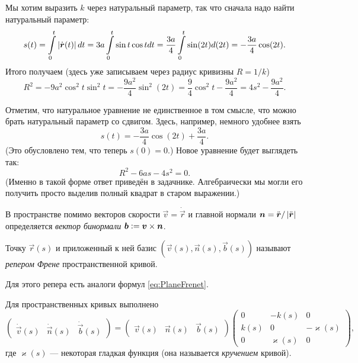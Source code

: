 \begin{solution}
	Мы хотим выразить $k$ через натуральный параметр, так что сначала надо найти натуральный параметр:
	\[
		s(t) = \int\limits_0^t\abs{\dot{\vec{r}}(t)}dt = 3a\int\limits_0^t\sin t\cos tdt = \frac{3a}{4}\int\limits_0^t\sin(2t) d(2t) = -\frac{3a}{4}\cos(2t).
	\]
	Итого получаем (здесь уже записываем через радиус кривизны $R = 1 / k$)
	\[
		R^2 = -9a^2\cos^2t\sin^2t = -\frac{9a^2}{4}\sin^2(2t) = \frac{9}{4}\cos^2t - \frac{9a^2}{4} = 4s^2 - \frac{9a^2}{4}.
	\]

	Отметим, что натуральное уравнение не единственное в том смысле, что можно брать натуральный параметр со сдвигом. Здесь, например, немного удобнее взять
	\[
		s(t) = -\frac{3a}{4}\cos(2t) + \frac{3a}{4}.
	\]
	(Это обусловлено тем, что теперь $s(0) = 0$.) Новое уравнение будет выглядеть так:
	\[
		R^2 - 6as - 4s^2 = 0.
	\]
	(Именно в такой форме ответ приведён в задачнике. Алгебраически мы могли его получить просто выделив полный квадрат в старом выражении.)
\end{solution}

В пространстве помимо векторов скорости $\vec{v} = \dot{\vec{r}}$ и главной нормали $\vec{n} = \ddot{\vec{r}} / \abs{\ddot{\vec{r}}}$ определяется \textit{вектор бинормали} $\vec{b} \vcentcolon = \vec{v} \times \vec{n}$.

\begin{definition}
	Точку $\vec{r}(s)$ и приложенный к ней базис $(\vec{v}(s), \vec{n}(s), \vec{b}(s))$ называют \textit{репером Френе} пространственной кривой.
\end{definition}

Для этого репера есть аналоги формул \eqref{eq:PlaneFrenet}.

\begin{theorem}
	Для пространственных кривых выполнено
	\begin{equation} \label{eq:SpaceFrenet}
		\begin{pmatrix}
			\dot{\vec{v}}(s) & \dot{\vec{n}}(s) & \dot{\vec{b}}(s)
		\end{pmatrix} = 
		\begin{pmatrix}
			\vec{v}(s) & \vec{n}(s) & \vec{b}(s)
		\end{pmatrix}
		\begin{pmatrix}
			0 & -k(s) & 0 \\
			k(s) & 0 & -\varkappa(s) \\
			0 & \varkappa(s) & 0
		\end{pmatrix},
	\end{equation}
	где $\varkappa(s)$ --- некоторая гладкая функция (она называется \textit{кручением} кривой).
\end{theorem}

